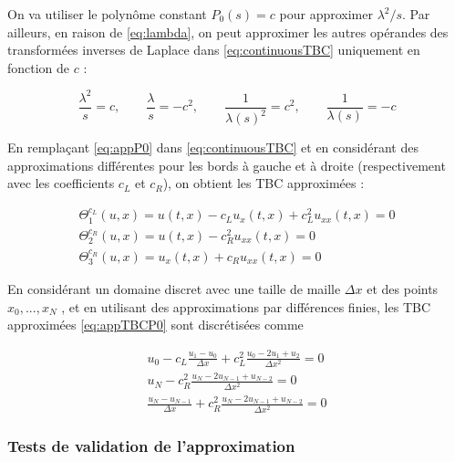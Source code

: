 \indent On va utiliser le polynôme constant $P_0(s) = c$  pour approximer $\lambda^2/s$. Par ailleurs, en raison de \eqref{eq:lambda}, on peut approximer les autres opérandes des transformées inverses de Laplace dans \eqref{eq:continuousTBC} uniquement en fonction de $c$ :

\begin{equation}
	\label{eq:appP0}
	\frac{\lambda^2}{s}  = c, \qquad
	\frac{\lambda}{s}  = -c^2, \qquad
	\frac{1}{\lambda(s)^2}  = c^2,\qquad 
	 \frac{1}{\lambda(s)}  = -c 
\end{equation}

\indent En remplaçant \eqref{eq:appP0}  dans \eqref{eq:continuousTBC} et en considérant des approximations différentes pour les bords à gauche et à droite (respectivement avec les coefficients $c_L$ et $c_R$), on obtient les TBC approximées :

\begin{equation}
\label{eq:appTBCP0}
    \begin{gathered}
        \Theta_1^{c_L}(u,x) = u(t,x) - c_L u_x(t,x)  + c_L^2  u_{xx}(t,x) = 0 \\
        \Theta_2^{c_R}(u,x) = u(t,x) - c_R^2  u_{xx}(t,x) = 0 \\
        \Theta_3^{c_R}(u,x) = u_x(t,x) + c_R u_{xx}(t,x)= 0 
    \end{gathered}
\end{equation}

\indent En considérant un domaine discret avec une taille de maille $\Delta x$ et des points $x_0, ..., x_N$ , et en utilisant des approximations par différences finies, les TBC approximées \eqref{eq:appTBCP0} sont discrétisées comme

\begin{equation*}
    \begin{gathered}
        u_0 - c_L \frac{u_1 - u_0}{\Delta x}  + c_L^2  \frac{u_0 -2u_1 + u_2}{\Delta x^2} = 0 \\
        u_N - c_R^2    \frac{u_N -2u_{N-1} + u_{N-2}}{\Delta x^2} = 0 \\
        \frac{u_N - u_{N-1}}{\Delta x}  + c_R^2    \frac{u_N -2u_{N-1} + u_{N-2}}{\Delta x^2} = 0 
    \end{gathered}
\end{equation*}

\subsubsection{Tests de validation de l'approximation}

